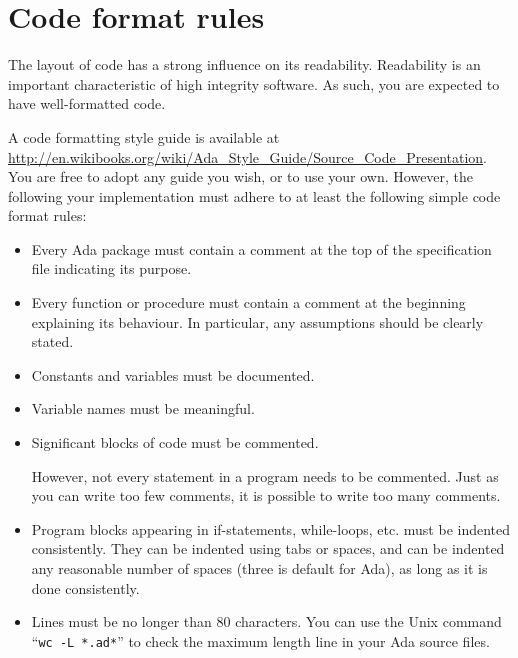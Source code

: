 \section{Code format rules}
\label{app:code-format-rules}

The layout of code has a strong influence on its readability. Readability is an important characteristic of high integrity software. As such, you are expected to have well-formatted code. 

A code formatting style guide is available at \url{http://en.wikibooks.org/wiki/Ada_Style_Guide/Source_Code_Presentation}. You are free to adopt any guide you wish, or to use your own. However, the following your implementation must adhere to at least the following simple code format rules:

\begin{itemize}

\item Every Ada package must contain a comment at the top of the specification file indicating its purpose.

\item Every function or procedure must contain a comment at the beginning explaining its behaviour. In particular, any assumptions should be clearly stated.

\item Constants and variables must be documented.

\item Variable names must be meaningful.

\item Significant blocks of code must be commented.

However, not every statement in a program needs to be commented. Just as you can write too few comments, it is possible to write too many comments.

\item Program blocks appearing in if-statements, while-loops, etc. must be indented consistently. They can be indented using tabs or spaces, and can be indented any reasonable number of spaces (three is default for Ada), as long as it is done consistently.

\item Lines must be no longer than 80 characters. You can use the Unix command ``\texttt{wc -L *.ad*}'' to check the maximum length line in your Ada source files.

\end{itemize} 

